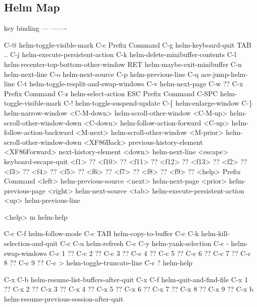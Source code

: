 \documentclass[11pt]{article}
\begin{document}
\subsection{Helm Map}
\label{sec:org42d366b}
key             binding
---             -------

C-@             helm-toggle-visible-mark
C-c             Prefix Command
C-g             helm-keyboard-quit
TAB .. C-j      helm-execute-persistent-action
C-k             helm-delete-minibuffer-contents
C-l             helm-recenter-top-bottom-other-window
RET             helm-maybe-exit-minibuffer
C-n             helm-next-line
C-o             helm-next-source
C-p             helm-previous-line
C-q             ace-jump-helm-line
C-t             helm-toggle-resplit-and-swap-windows
C-v             helm-next-page
C-w             ??
C-x             Prefix Command
C-z             helm-select-action
ESC             Prefix Command
C-SPC           helm-toggle-visible-mark
C-!             helm-toggle-suspend-update
C-\{             helm-enlarge-window
C-\}             helm-narrow-window
<C-M-down>      helm-scroll-other-window
<C-M-up>        helm-scroll-other-window-down
<C-down>        helm-follow-action-forward
<C-up>          helm-follow-action-backward
<M-next>        helm-scroll-other-window
<M-prior>       helm-scroll-other-window-down
<XF86Back>      previous-history-element
<XF86Forward>   next-history-element
<down>          helm-next-line
<escape>        keyboard-escape-quit
<f1>            ??
<f10>           ??
<f11>           ??
<f12>           ??
<f13>           ??
<f2>            ??
<f3>            ??
<f4>            ??
<f5>            ??
<f6>            ??
<f7>            ??
<f8>            ??
<f9>            ??
<help>          Prefix Command
<left>          helm-previous-source
<next>          helm-next-page
<prior>         helm-previous-page
<right>         helm-next-source
<tab>           helm-execute-persistent-action
<up>            helm-previous-line

<help> m        helm-help

C-c C-f         helm-follow-mode
C-c TAB         helm-copy-to-buffer
C-c C-k         helm-kill-selection-and-quit
C-c C-u         helm-refresh
C-c C-y         helm-yank-selection
C-c -           helm-swap-windows
C-c 1           ??
C-c 2           ??
C-c 3           ??
C-c 4           ??
C-c 5           ??
C-c 6           ??
C-c 7           ??
C-c 8           ??
C-c 9           ??
C-c >           helm-toggle-truncate-line
C-c ?           helm-help

C-x C-b         helm-resume-list-buffers-after-quit
C-x C-f         helm-quit-and-find-file
C-x 1           ??
C-x 2           ??
C-x 3           ??
C-x 4           ??
C-x 5           ??
C-x 6           ??
C-x 7           ??
C-x 8           ??
C-x 9           ??
C-x b           helm-resume-previous-session-after-quit
\end{document}
